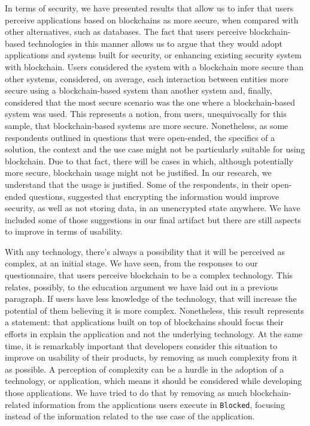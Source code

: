 In terms of security, we have presented results that allow us to infer that users perceive applications based on blockchains as more secure, when compared with other alternatives, such as databases. The fact that users perceive blockchain-based technologies in this manner allows us to argue that they would adopt applications and systems built for security, or enhancing existing security system with blockchain. Users considered the system with a blockchain more secure than other systems, considered, on average, each interaction between entities more secure using a blockchain-based system than another system and, finally, considered that the most secure scenario was the one where a blockchain-based system was used. This represents a notion, from users, unequivocally for this sample, that blockchain-based systems are more secure. Nonetheless, as some respondents outlined in questions that were open-ended, the specifics of a solution, the context and the use case might not be particularly suitable for using blockchain. Due to that fact, there will be cases in which, although potentially more secure, blockchain usage might not be justified. In our research, we understand that the usage is justified. Some of the respondents, in their open-ended questions, suggested that encrypting the information would improve security, as well as not storing data, in an unencrypted state anywhere. We have included some of those suggestions in our final artifact but there are still aspects to improve in terms of usability.

With any technology, there's always a possibility that it will be perceived as complex, at an initial stage. We have seen, from the responses to our questionnaire, that users perceive blockchain to be a complex technology. This relates, possibly, to the education argument we have laid out in a previous paragraph. If users have less knowledge of the technology, that will increase the potential of them believing it is more complex. Nonetheless, this result represents a statement: that applications built on top of blockchains should focus their efforts in explain the application and not the underlying technology. At the same time, it is remarkably important that developers consider this situation to improve on usability of their products, by removing as much complexity from it as possible. A perception of complexity can be a hurdle in the adoption of a technology, or application, which means it should be considered while developing those applications. We have tried to do that by removing as much blockchain-related information from the applications users execute in \texttt{Blocked}, focusing instead of the information related to the use case of the application.

